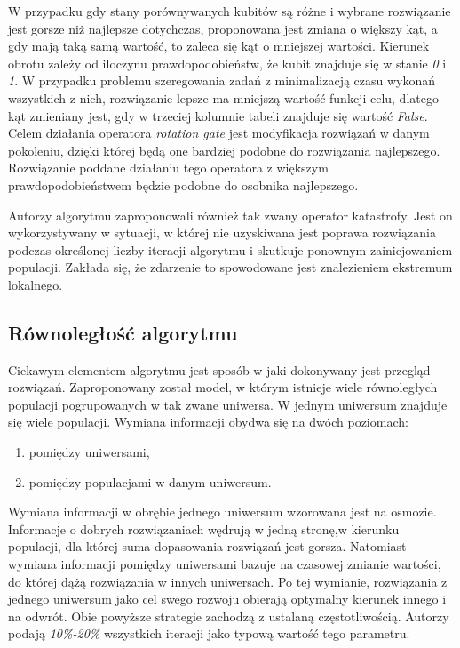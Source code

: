 W przypadku gdy stany porównywanych kubitów są różne i wybrane rozwiązanie jest gorsze niż najlepsze dotychczas, proponowana jest zmiana o większy kąt, a gdy mają taką samą wartość, to zaleca się kąt o mniejszej wartości. Kierunek obrotu zależy od iloczynu prawdopodobieństw, że kubit znajduje się w stanie \textit{0} i \textit{1}. W przypadku problemu szeregowania zadań z minimalizacją czasu wykonań wszystkich z nich, rozwiązanie lepsze ma mniejszą wartość funkcji celu, dlatego kąt zmieniany jest, gdy w trzeciej kolumnie tabeli znajduje się wartość \textit{False}. Celem działania operatora \textit{rotation gate} jest  modyfikacja rozwiązań w danym pokoleniu, dzięki której będą one bardziej podobne do rozwiązania najlepszego. Rozwiązanie poddane działaniu tego operatora z większym prawdopodobieństwem będzie podobne do osobnika najlepszego.

Autorzy algorytmu zaproponowali również tak zwany operator katastrofy. Jest on wykorzystywany w sytuacji, w której nie uzyskiwana jest poprawa rozwiązania podczas określonej liczby iteracji algorytmu i skutkuje ponownym zainicjowaniem populacji. Zakłada się, że zdarzenie to spowodowane jest znalezieniem ekstremum lokalnego.

\subsection{Równoległość algorytmu}
Ciekawym elementem algorytmu jest sposób w jaki dokonywany jest przegląd rozwiązań. Zaproponowany został model, w którym istnieje wiele równoległych populacji pogrupowanych w tak zwane uniwersa. W jednym uniwersum znajduje się wiele populacji. Wymiana informacji obydwa się na dwóch poziomach:
\begin{enumerate}
\item pomiędzy uniwersami,
\item pomiędzy populacjami w danym uniwersum.
\end{enumerate}

Wymiana informacji w obrębie jednego uniwersum wzorowana jest na osmozie. Informacje o dobrych rozwiązaniach wędrują w jedną stronę,w kierunku populacji, dla której suma dopasowania rozwiązań jest gorsza. Natomiast wymiana informacji pomiędzy uniwersami bazuje na czasowej zmianie wartości, do której dążą rozwiązania w innych uniwersach. Po tej wymianie, rozwiązania z jednego uniwersum jako cel swego rozwoju obierają optymalny kierunek innego i na odwrót.
Obie powyższe strategie zachodzą z ustalaną częstotliwością. Autorzy podają \textit{10\%-20\%} wszystkich iteracji jako typową wartość tego parametru. 

